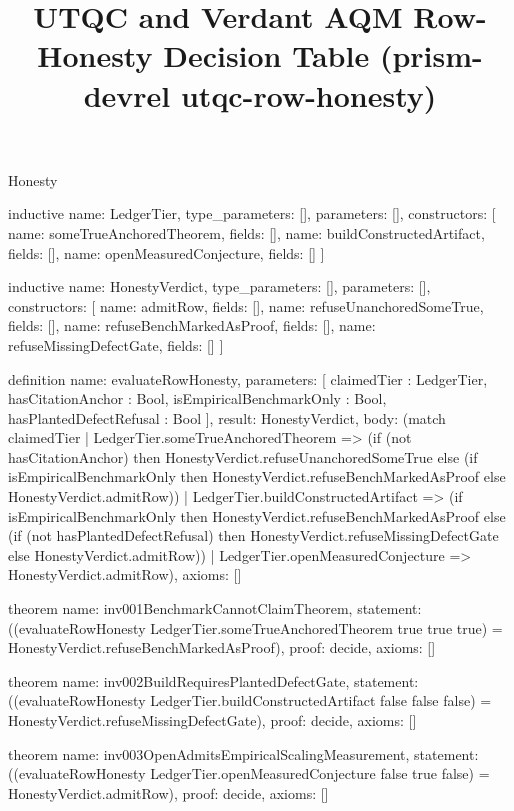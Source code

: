 \begin{lexlean}{Honesty}
\title{UTQC and Verdant AQM Row-Honesty Decision Table (prism-devrel utqc-row-honesty)}

\begin{semanticmodule}

inductive{
  name: LedgerTier,
  type_parameters: [],
  parameters: [],
  constructors: [
    {name: someTrueAnchoredTheorem, fields: []},
    {name: buildConstructedArtifact, fields: []},
    {name: openMeasuredConjecture, fields: []}
  ]
}

inductive{
  name: HonestyVerdict,
  type_parameters: [],
  parameters: [],
  constructors: [
    {name: admitRow, fields: []},
    {name: refuseUnanchoredSomeTrue, fields: []},
    {name: refuseBenchMarkedAsProof, fields: []},
    {name: refuseMissingDefectGate, fields: []}
  ]
}

definition{
  name: evaluateRowHonesty,
  parameters: [
    claimedTier : LedgerTier,
    hasCitationAnchor : Bool,
    isEmpiricalBenchmarkOnly : Bool,
    hasPlantedDefectRefusal : Bool
  ],
  result: HonestyVerdict,
  body: (match claimedTier
    | LedgerTier.someTrueAnchoredTheorem =>
        (if (not hasCitationAnchor)
          then HonestyVerdict.refuseUnanchoredSomeTrue
          else (if isEmpiricalBenchmarkOnly
            then HonestyVerdict.refuseBenchMarkedAsProof
            else HonestyVerdict.admitRow))
    | LedgerTier.buildConstructedArtifact =>
        (if isEmpiricalBenchmarkOnly
          then HonestyVerdict.refuseBenchMarkedAsProof
          else (if (not hasPlantedDefectRefusal)
            then HonestyVerdict.refuseMissingDefectGate
            else HonestyVerdict.admitRow))
    | LedgerTier.openMeasuredConjecture =>
        HonestyVerdict.admitRow),
  axioms: []
}

theorem{
  name: inv001BenchmarkCannotClaimTheorem,
  statement: ((evaluateRowHonesty LedgerTier.someTrueAnchoredTheorem true true true)
    = HonestyVerdict.refuseBenchMarkedAsProof),
  proof: decide{},
  axioms: []
}

theorem{
  name: inv002BuildRequiresPlantedDefectGate,
  statement: ((evaluateRowHonesty LedgerTier.buildConstructedArtifact false false false)
    = HonestyVerdict.refuseMissingDefectGate),
  proof: decide{},
  axioms: []
}

theorem{
  name: inv003OpenAdmitsEmpiricalScalingMeasurement,
  statement: ((evaluateRowHonesty LedgerTier.openMeasuredConjecture false true false)
    = HonestyVerdict.admitRow),
  proof: decide{},
  axioms: []
}


\end{semanticmodule}
\end{lexlean}
